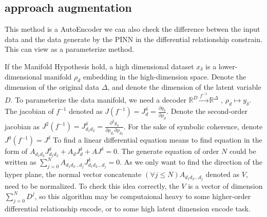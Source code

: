 \documentclass{article}
\begin{document}
\subsection{approach augmentation}
This method is a AutoEncoder we can also check the difference
betwen the input data and the data generate by the PINN in the
differential relationship constrain. This can view as a parameterize method.

If the Manifold Hypothesis hold, a high dimensional
dataset $x_\delta$ is a lower-dimensional manifold $\rho_d$ embedding in
the high-dimension space. Denote the dimension of the
original data $\Delta$, and denote the dimension of the
latent variable $D$. To parameterize the data manifold,
we need a decoder $\mathbb{R}^{D} \xrightarrow{f^{-1}} \mathbb{R}^{\Delta}$
, ${\rho}_d \mapsto y_\delta$. The jacobian of ${f^{-1}}$
denoted as $J({f^{-1}})=J^\delta_d=\frac{\partial y_\delta}{\partial \rho_d}$.
Denote the second-order jacobian as
$J^2({f^{-1}})=J^\delta_{d_1 d_2}=\frac{\partial^2 y_\delta}{\partial \rho_{d_1}\partial \rho_{d_2}}$.
For the sake of symbolic coherence, denote
$J^0({f^{-1}})=J^\delta$
To find a linear differential equation means to find
equation in the form of
$A_{d_1 d_2}J^\delta_{d_1 d_2}+A_{d}J^\delta_d+AJ^\delta=0$. The generate
equation of order $N$ could be written as
$\sum_{j=0}^{N} A_{d_1 d_2 ... d_j}J^\delta_{d_1 d_2 ... d_j}=0$.
As we only want to find the direction of the hyper plane,
the normal vector concatenate $(\forall j\leq N)A_{d_1 d_2 ... d_j}$
denoted as $V$, need to be normalized. To check this idea correctly, the $V$ is a
vector of dimension $\sum_{j=0}^{N} D^{j}$, so this algorithm
may be computaional heavy to some higher-order differential
relationship encode, or to some high latent dimension encode task.
\end{document}
